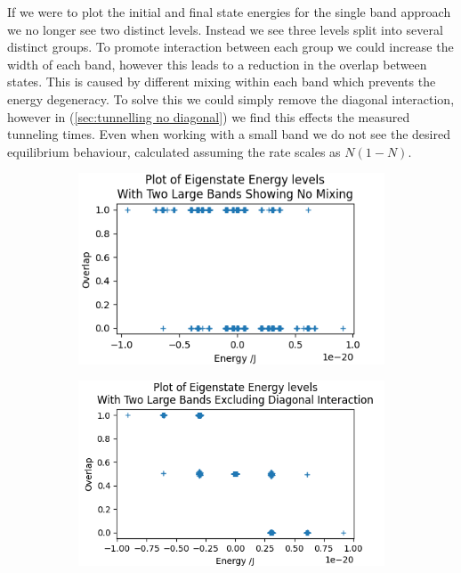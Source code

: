 If we were to plot the initial and final
state energies for the single band approach
we no longer see two distinct levels. Instead
we see three levels split into
several distinct groups.
To promote interaction between each group
we could increase the width of each band,
however this leads to a reduction in
the overlap between states. This is
caused by different mixing
within each band which prevents
the energy degeneracy. To solve this
we could simply remove the diagonal
interaction, however in (\cref{sec:tunnelling no diagonal})
we find this effects the
measured tunneling times.
Even when
working with a small band
we do not see the desired equilibrium
behaviour, calculated assuming the rate
scales as \(N(1-N)\).
\begin{figure}[htbp]
    \centering
    \begin{subfigure}{0.45\linewidth}
        \includegraphics[width=0.9\linewidth]{Figures/Simulation/Two Large Bands No Mixing.png}
        \label{fig:two band minimum mixing}
    \end{subfigure}
    \begin{subfigure}{0.45\linewidth}
        \includegraphics[width=0.9\linewidth]{Figures/Simulation/Two Large Bands No Diagonal.png}

\end{subfigure}
\end{figure}
